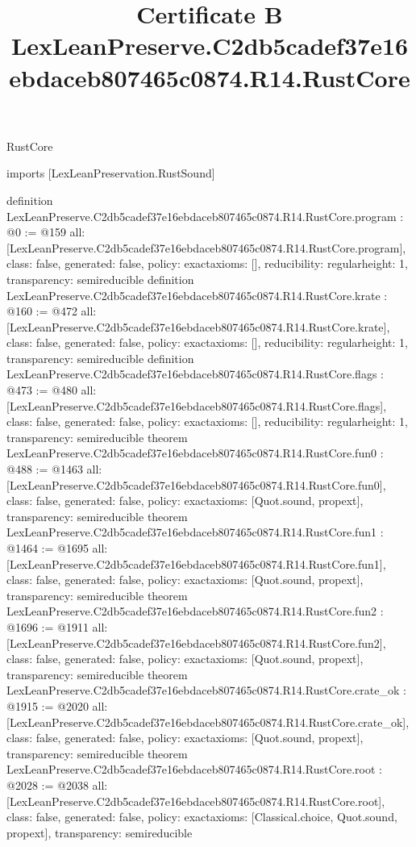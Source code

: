 \begin{lexlean}{RustCore}
\title{Certificate B LexLeanPreserve.C2db5cadef37e16ebdaceb807465c0874.R14.RustCore}
\begin{coremodule}
imports [LexLeanPreservation.RustSound]

definition LexLeanPreserve.C2db5cadef37e16ebdaceb807465c0874.R14.RustCore.program : @0 := @159 {
  all: [LexLeanPreserve.C2db5cadef37e16ebdaceb807465c0874.R14.RustCore.program],
  class: false,
  generated: false,
  policy: exact{axioms: []},
  reducibility: regular{height: 1},
  transparency: semireducible
}
definition LexLeanPreserve.C2db5cadef37e16ebdaceb807465c0874.R14.RustCore.krate : @160 := @472 {
  all: [LexLeanPreserve.C2db5cadef37e16ebdaceb807465c0874.R14.RustCore.krate],
  class: false,
  generated: false,
  policy: exact{axioms: []},
  reducibility: regular{height: 1},
  transparency: semireducible
}
definition LexLeanPreserve.C2db5cadef37e16ebdaceb807465c0874.R14.RustCore.flags : @473 := @480 {
  all: [LexLeanPreserve.C2db5cadef37e16ebdaceb807465c0874.R14.RustCore.flags],
  class: false,
  generated: false,
  policy: exact{axioms: []},
  reducibility: regular{height: 1},
  transparency: semireducible
}
theorem LexLeanPreserve.C2db5cadef37e16ebdaceb807465c0874.R14.RustCore.fun0 : @488 := @1463 {
  all: [LexLeanPreserve.C2db5cadef37e16ebdaceb807465c0874.R14.RustCore.fun0],
  class: false,
  generated: false,
  policy: exact{axioms: [Quot.sound, propext]},
  transparency: semireducible
}
theorem LexLeanPreserve.C2db5cadef37e16ebdaceb807465c0874.R14.RustCore.fun1 : @1464 := @1695 {
  all: [LexLeanPreserve.C2db5cadef37e16ebdaceb807465c0874.R14.RustCore.fun1],
  class: false,
  generated: false,
  policy: exact{axioms: [Quot.sound, propext]},
  transparency: semireducible
}
theorem LexLeanPreserve.C2db5cadef37e16ebdaceb807465c0874.R14.RustCore.fun2 : @1696 := @1911 {
  all: [LexLeanPreserve.C2db5cadef37e16ebdaceb807465c0874.R14.RustCore.fun2],
  class: false,
  generated: false,
  policy: exact{axioms: [Quot.sound, propext]},
  transparency: semireducible
}
theorem LexLeanPreserve.C2db5cadef37e16ebdaceb807465c0874.R14.RustCore.crate_ok : @1915 := @2020 {
  all: [LexLeanPreserve.C2db5cadef37e16ebdaceb807465c0874.R14.RustCore.crate_ok],
  class: false,
  generated: false,
  policy: exact{axioms: [Quot.sound, propext]},
  transparency: semireducible
}
theorem LexLeanPreserve.C2db5cadef37e16ebdaceb807465c0874.R14.RustCore.root : @2028 := @2038 {
  all: [LexLeanPreserve.C2db5cadef37e16ebdaceb807465c0874.R14.RustCore.root],
  class: false,
  generated: false,
  policy: exact{axioms: [Classical.choice, Quot.sound, propext]},
  transparency: semireducible
}


\end{coremodule}
\end{lexlean}

